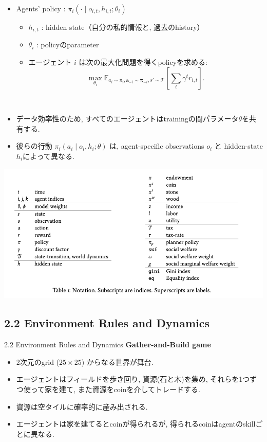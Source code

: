 \documentclass[unicode,aspectratio=169,11pt]{beamer}
\begin{document}
\begin{frame}{}{}
\begin{itemize}
    \item Agents' policy : $\pi_i(\cdot \mid o_{i,t}, h_{i,t}; \theta_i)$
    \begin{itemize}
        \item $h_{i,t}$ : hidden state（自分の私的情報と, 過去のhistory）
        \item $\theta_i$ : policyのparameter
        \item エージェント $i$ は次の最大化問題を得くpolicyを求める:
        \[
            \max_{\theta_i} \mathbb{E}_{a_i \sim \pi_i, \bm{a}_{-i} \sim \bm{\pi}_{-i}, s'\sim \mathscr{T}}\left[\sum_{t}\gamma^t r_{i,t}\right].
            \tag{1}
        \]
    \end{itemize}
    　
    \item データ効率性のため, すべてのエージェントはtrainingの間パラメータ$\theta$を共有する.
    \item 彼らの行動 $\pi_i(a_i\mid o_i, h_i; \theta)$ は, agent-specific observations $o_i$ と hidden-state $h_i$によって異なる.
\end{itemize}
\end{frame}

\begin{frame}
    \begin{center}
        \includegraphics[width=15cm]{table1.png}
    \end{center}
\end{frame}

\subsection{2.2 Environment Rules and Dynamics}
\begin{frame}{2.2 Environment Rules and Dynamics}{}
{\bf Gather-and-Build game}
\begin{itemize}
    \item 2次元のgrid ($25 \times 25$) からなる世界が舞台.
    \item エージェントはフィールドを歩き回り, 資源(石と木)を集め, それらを1つずつ使って家を建て, また資源をcoinを介してトレードする.
    \item 資源は空タイルに確率的に産み出される.
    \item エージェントは家を建てるとcoinが得られるが, 得られるcoinはagentのskillごとに異なる.
\end{itemize}
\end{frame}
\end{document}
